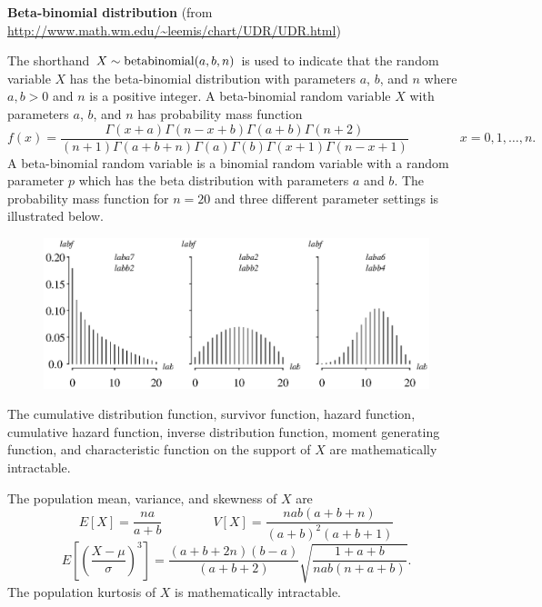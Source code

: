 \documentclass[12pt,fullpage]{article}
\begin{document}
\noindent
{\bf Beta-binomial distribution} (from \color{blue}\url{http://www.math.wm.edu/~leemis/chart/UDR/UDR.html}\color{black})

\noindent
The shorthand $X \sim {\rm betabinomial}(a, b, n)$ is used to indicate that the
random variable $X$ has the beta-binomial distribution with parameters $a$, $b$, and $n$ where $a,b>0$ and $n$ is a positive integer.
A beta-binomial random variable $X$ with parameters $a$, $b$, and $n$ has probability mass function 
$$
f(x) = \frac{\Gamma \left( x+a \right) \Gamma \left( n-x+b \right) \Gamma \left( a+b \right)
\Gamma  \left( n+2 \right) }{ \left( n+1 \right) \Gamma  \left( a+b+n \right) \Gamma  \left( a
 \right) \Gamma  \left( b \right) \Gamma  \left( x+1 \right) \Gamma \left( n-x+1 \right)} \qquad \qquad x = 0, 1, \ldots, n.
$$
A beta-binomial random variable is a binomial random variable with a random parameter $p$ which has the
beta distribution with parameters $a$ and $b$.
The probability mass function for $n=20$ and three different parameter settings is illustrated below. \\

\begin{figure}[h!]
\begin{center}
\includegraphics[width=5.6in]{BetabinomialPlot.ps}
\end{center}
\end{figure}

\noindent
The cumulative distribution function, survivor function, hazard function,
cumulative hazard function, inverse distribution function, moment generating function, and characteristic function 
on the support of $X$ are mathematically intractable.

\vspace{0.05in}

\noindent
The population mean, variance, and skewness of $X$ are
$$
E[X] = \frac{na}{a+b} \qquad \qquad V[X] = \frac{nab(a+b+n)}{(a+b)^2(a+b+1)} 
$$
$$
E \left[ \left( \frac{X - \mu}{\sigma} \right)^3 \right] =
\frac{(a+b+2n)(b-a)}{(a+b+2)} \sqrt{\frac{1+a+b}{nab(n+a+b)}}.
$$
The population kurtosis of $X$ is mathematically intractable.
%
%
%
%
\end{document}
